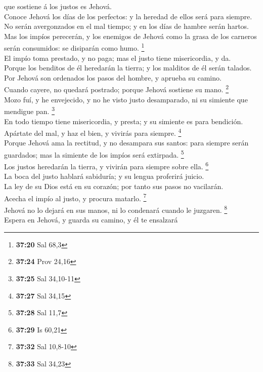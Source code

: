 que sostiene á los justos es Jehová.\\
 Conoce Jehová los días de los perfectos: y la heredad de
ellos será para siempre.\\
 No serán avergonzados en el mal tiempo; y en los días de
hambre serán hartos.\\
 Mas los impíos perecerán, y los enemigos de Jehová como
la grasa de los carneros serán consumidos: se disiparán como humo.
\footnote{\textbf{37:20} Sal 68,3}\\
 El impío toma prestado, y no paga; mas el justo tiene
misericordia, y da.\\
 Porque los benditos de él heredarán la tierra; y los
malditos de él serán talados.\\
 Por Jehová son ordenados los pasos del hombre, y aprueba
su camino.\\
 Cuando cayere, no quedará postrado; porque Jehová
sostiene su mano. \footnote{\textbf{37:24} Prov 24,16}\\
 Mozo fuí, y he envejecido, y no he visto justo
desamparado, ni su simiente que mendigue pan. \footnote{\textbf{37:25}
  Sal 34,10-11}\\
 En todo tiempo tiene misericordia, y presta; y su
simiente es para bendición.\\
 Apártate del mal, y haz el bien, y vivirás para siempre.
\footnote{\textbf{37:27} Sal 34,15}\\
 Porque Jehová ama la rectitud, y no desampara sus
santos: para siempre serán guardados; mas la simiente de los impíos será
extirpada. \footnote{\textbf{37:28} Sal 11,7}\\
 Los justos heredarán la tierra, y vivirán para siempre
sobre ella. \footnote{\textbf{37:29} Is 60,21}\\
 La boca del justo hablará sabiduría; y su lengua
proferirá juicio.\\
 La ley de su Dios está en su corazón; por tanto sus
pasos no vacilarán.\\
 Acecha el impío al justo, y procura matarlo.
\footnote{\textbf{37:32} Sal 10,8-10}\\
 Jehová no lo dejará en sus manos, ni lo condenará cuando
le juzgaren. \footnote{\textbf{37:33} Sal 34,23}\\
 Espera en Jehová, y guarda su camino, y él te ensalzará
